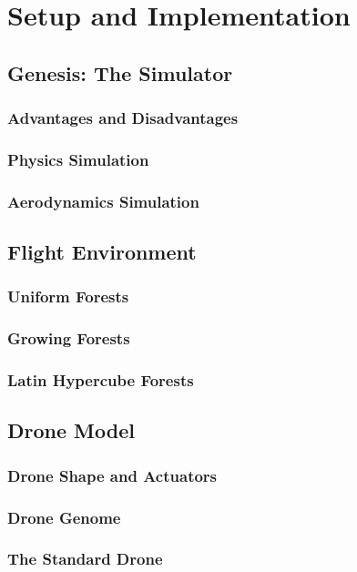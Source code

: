 \chapter{Setup and Implementation}
\section{Genesis: The Simulator}
\subsection{Advantages and Disadvantages}
\subsection{Physics Simulation}
\subsection{Aerodynamics Simulation}

\section{Flight Environment}
\subsection{Uniform Forests}
\subsection{Growing Forests}
\subsection{Latin Hypercube Forests}

\section{Drone Model}
\subsection{Drone Shape and Actuators}
\subsection{Drone Genome}
\subsection{The Standard Drone}

